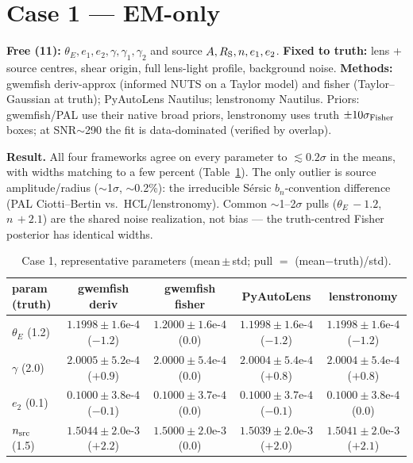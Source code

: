 \documentclass[10pt]{article}
\begin{document}
\section{Case 1 --- EM-only}
\textbf{Free (11):} $\theta_E, e_1, e_2, \gamma, \gamma_1, \gamma_2$ and source
$A, R_{\rm S}, n, e_1, e_2$. \textbf{Fixed to truth:} lens + source centres, shear origin, full
lens-light profile, background noise. \textbf{Methods:} gwemfish deriv-approx (informed NUTS on a
Taylor model) and fisher (Taylor--Gaussian at truth); PyAutoLens Nautilus; lenstronomy Nautilus.
Priors: gwemfish/PAL use their native broad priors, lenstronomy uses truth $\pm10\sigma_{\rm Fisher}$
boxes; at SNR$\sim$290 the fit is data-dominated (verified by overlap).

\textbf{Result.} All four frameworks agree on every parameter to $\lesssim0.2\sigma$ in the means,
with widths matching to a few percent (Table~\ref{tab:c1}). The only outlier is source
amplitude/radius ($\sim$1$\sigma$, $\sim$0.2\%): the irreducible S\'ersic $b_n$-convention
difference (PAL Ciotti--Bertin vs.\ HCL/lenstronomy). Common $\sim$1--2$\sigma$ pulls
($\theta_E\,{-}1.2$, $n\,{+}2.1$) are the shared noise realization, not bias --- the truth-centred
Fisher posterior has identical widths.

\begin{table}[h]\centering\footnotesize
\caption{Case 1, representative parameters (mean\,$\pm$\,std; pull $=$ (mean$-$truth)/std).}
\label{tab:c1}
\begin{tabular}{lcccc}
\toprule
param (truth) & gwemfish deriv & gwemfish fisher & PyAutoLens & lenstronomy \\
\midrule
$\theta_E$ (1.2) & $1.1998\pm1.6\text{e-}4$ ($-1.2$) & $1.2000\pm1.6\text{e-}4$ ($0.0$) & $1.1998\pm1.6\text{e-}4$ ($-1.2$) & $1.1998\pm1.6\text{e-}4$ ($-1.2$)\\
$\gamma$ (2.0) & $2.0005\pm5.2\text{e-}4$ ($+0.9$) & $2.0000\pm5.4\text{e-}4$ ($0.0$) & $2.0004\pm5.4\text{e-}4$ ($+0.8$) & $2.0004\pm5.4\text{e-}4$ ($+0.8$)\\
$e_2$ (0.1) & $0.1000\pm3.8\text{e-}4$ ($-0.1$) & $0.1000\pm3.7\text{e-}4$ ($0.0$) & $0.1000\pm3.7\text{e-}4$ ($-0.1$) & $0.1000\pm3.8\text{e-}4$ ($0.0$)\\
$n_{\rm src}$ (1.5) & $1.5044\pm2.0\text{e-}3$ ($+2.2$) & $1.5000\pm2.0\text{e-}3$ ($0.0$) & $1.5039\pm2.0\text{e-}3$ ($+2.0$) & $1.5041\pm2.0\text{e-}3$ ($+2.1$)\\
\bottomrule
\end{tabular}
\end{table}
\end{document}
